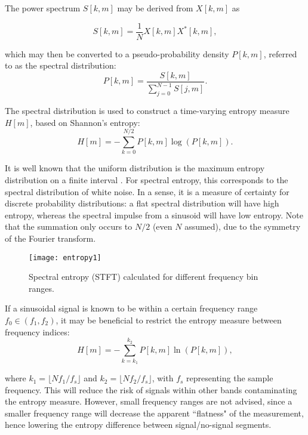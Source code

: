 The power spectrum $S[k, m]$ may be derived from $X[k, m]$ as

\begin{equation*}
	S[k,m] = \frac{1}{N}X[k,m] X^*[k,m],
\end{equation*}

\noindent which may then be converted to a pseudo-probability density $P[k,m]$, referred to as the spectral distribution:
\begin{equation}
\label{eqn:specdistp1}
	P[k,m] = \frac{S[k,m]}{\sum_{j=0}^{N-1} S[j,m]}.
\end{equation}

The spectral distribution is used to construct a time-varying entropy measure $H[m]$, based on Shannon's entropy:
\begin{equation}
\label{eqn:entropyp1}
	H[m] = - \sum_{k=0}^{N/2} P[k,m] \log (P[k,m]).
\end{equation}

It is well known that the uniform distribution is the maximum entropy distribution on a finite interval \citep{maxentropy}.  For spectral entropy, this corresponds to the spectral distribution of white noise. In a sense, it is a measure of certainty for discrete probability distributions: a flat spectral distribution will have high entropy, whereas the spectral impulse from a sinusoid will have low entropy. Note that the summation only occurs to $N/2$ (even $N$ assumed), due to the symmetry of the Fourier transform.

\begin{figure}[!t]
	\centering
	\texttt{[image: entropy1]}
	\caption{Spectral entropy (STFT) calculated for different frequency bin ranges.}
	\label{fig:entropy1}
\end{figure}

If a sinusoidal signal is known to be within a certain frequency range $f_0 \in (f_1, f_2)$, it may be beneficial to restrict the entropy measure between frequency indices:
\begin{equation*}
	H[m] = - \sum_{k=k_1}^{k_2} P[k,m] \ln (P[k,m]),
\end{equation*}

\noindent where $k_1 = \lfloor N f_1/f_s\rfloor$ and $k_2 = \lfloor N f_2/f_s\rfloor$, with $f_s$ representing the sample frequency. This will reduce the risk of signals within other bands contaminating the entropy measure. However, small frequency ranges are not advised, since a smaller frequency range will decrease the apparent ``flatness" of the measurement, hence lowering the entropy difference between signal/no-signal segments.

